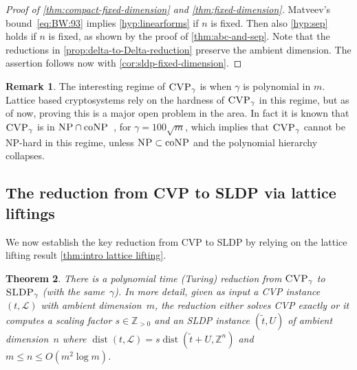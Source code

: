 \documentclass[10pt,a4paper]{article}
\newtheorem{theorem}{Theorem}[section]
\theoremstyle{definition}
\newtheorem{remark}[theorem]{Remark}
\DeclareMathOperator{\dist}{dist}
\newcommand{\ZZ}{\mathbb{Z}}
\numberwithin{equation}{section}
\begin{document}
\begin{proof}[Proof of \cref{thm:compact-fixed-dimension} and \cref{thm:fixed-dimension}]
Matveev's bound~\eqref{eq:BW:93} implies \cref{hyp:linearforms} if $n$ is fixed.
Then also \cref{hyp:sep} holds if $n$ is fixed, as shown by the proof of \cref{thm:abc-and-sep}.
Note that the reductions in \cref{prop:delta-to-Delta-reduction} preserve the ambient dimension.
The assertion follows now with \cref{cor:sldp-fixed-dimension}.
\end{proof}

\begin{remark}
The interesting regime of $\textsc{CVP}_\gamma$ is when $\gamma$ is polynomial in $m$.
Lattice based cryptosystems rely on the hardness of
$\textsc{CVP}_\gamma$ in this regime, but as of now,
proving this is a major open problem in the area.
In fact it is known that  $\textsc{CVP}_\gamma$
is in $\textsc{NP}\cap\text{co}\textsc{NP}$~\cite{aharonov-regev},
for $\gamma=100\sqrt{m}$,
which implies that $\textsc{CVP}_\gamma$
cannot be \textsc{NP}-hard in this regime,
unless $\textsc{NP}\subset\text{co}\textsc{NP}$ and the polynomial hierarchy collapses.
\end{remark}


\subsection{The reduction from \textsc{CVP} to \textsc{SLDP} via lattice liftings}\label{sec:liftings}
We now establish the key reduction from
\textsc{CVP} to \textsc{SLDP}
by relying on the lattice lifting result \cref{thm:intro lattice lifting}.

\begin{theorem}\label{thm:red-cvp-2-sldp}
There is a polynomial time (Turing) reduction from
$\textsc{CVP}_{\gamma}$ to $\textsc{SLDP}_{\gamma}$
(with the same~$\gamma$).
In more detail, given as input a \textsc{CVP} instance $(t,\mathcal{L})$ with ambient dimension~$m$, the reduction either solves \textsc{CVP} exactly or it computes a scaling factor $s\in\ZZ_{>0}$ and an \textsc{SLDP} instance $(\tilde{t},U)$ of ambient dimension~$n$ where $\dist(t,\mathcal{L})=s\dist(\tilde{t}+U,\ZZ^n)$ and $m\le n\le O(m^2\log m)$.
\end{theorem}
\end{document}

